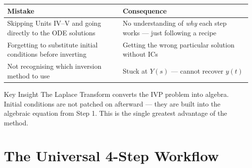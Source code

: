 \documentclass[12pt,a4paper]{article}
\begin{document}
\medskip
\begin{center}
\begin{tabular}{@{}p{7cm}p{7cm}@{}}
\toprule
\textbf{Mistake} & \textbf{Consequence} \\
\midrule
Skipping Units IV--V and going directly to the ODE solutions &
No understanding of \emph{why} each step works --- just following a recipe \\
\midrule
Forgetting to substitute initial conditions before inverting &
Getting the wrong particular solution without ICs \\
\midrule
Not recognising which inversion method to use &
Stuck at $Y(s)$ --- cannot recover $y(t)$ \\
\bottomrule
\end{tabular}
\end{center}
\medskip

\begin{learnbox}{Key Insight}
The Laplace Transform converts the IVP problem into algebra. Initial conditions are
not patched on afterward --- they are built into the algebraic equation from Step 1.
This is the single greatest advantage of the method.
\end{learnbox}

\section{The Universal 4-Step Workflow}
\end{document}
